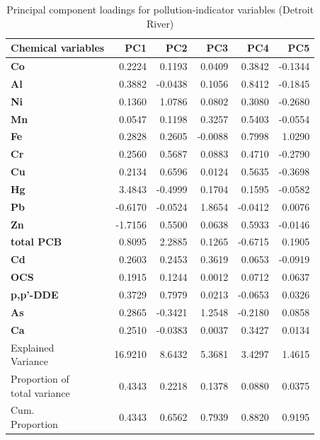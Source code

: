 \begin{table}[htbp]
  \centering
  \caption{Principal component loadings for pollution-indicator variables (Detroit River)}
  \label{tab:dr_01_pollution_assessment_pc_loadings}
  \begin{tabular}{lrrrrr}
    \toprule
    \textbf{Chemical variables} & \textbf{PC1} & \textbf{PC2} & \textbf{PC3} & \textbf{PC4} & \textbf{PC5} \\
    \midrule
    \textbf{Co} & 0.2224 & 0.1193 & 0.0409 & 0.3842 & -0.1344 \\
    \textbf{Al} & 0.3882 & -0.0438 & 0.1056 & 0.8412 & -0.1845 \\
    \textbf{Ni} & 0.1360 & 1.0786 & 0.0802 & 0.3080 & -0.2680 \\
    \textbf{Mn} & 0.0547 & 0.1198 & 0.3257 & 0.5403 & -0.0554 \\
    \textbf{Fe} & 0.2828 & 0.2605 & -0.0088 & 0.7998 & 1.0290 \\
    \textbf{Cr} & 0.2560 & 0.5687 & 0.0883 & 0.4710 & -0.2790 \\
    \textbf{Cu} & 0.2134 & 0.6596 & 0.0124 & 0.5635 & -0.3698 \\
    \addlinespace
    \textbf{Hg} & 3.4843 & -0.4999 & 0.1704 & 0.1595 & -0.0582 \\
    \textbf{Pb} & -0.6170 & -0.0524 & 1.8654 & -0.0412 & 0.0076 \\
    \textbf{Zn} & -1.7156 & 0.5500 & 0.0638 & 0.5933 & -0.0146 \\
    \textbf{total PCB} & 0.8095 & 2.2885 & 0.1265 & -0.6715 & 0.1905 \\
    \textbf{Cd} & 0.2603 & 0.2453 & 0.3619 & 0.0653 & -0.0919 \\
    \addlinespace
    \textbf{OCS} & 0.1915 & 0.1244 & 0.0012 & 0.0712 & 0.0637 \\
    \textbf{p,p'-DDE} & 0.3729 & 0.7979 & 0.0213 & -0.0653 & 0.0326 \\
    \addlinespace
    \textbf{As} & 0.2865 & -0.3421 & 1.2548 & -0.2180 & 0.0858 \\
    \addlinespace
    \textbf{Ca} & 0.2510 & -0.0383 & 0.0037 & 0.3427 & 0.0134 \\
    \midrule
    \makecell[l]{Explained\\Variance} & 16.9210 & 8.6432 & 5.3681 & 3.4297 & 1.4615 \\
    \makecell[l]{Proportion of\\total variance} & 0.4343 & 0.2218 & 0.1378 & 0.0880 & 0.0375 \\
    \makecell[l]{Cum.\\Proportion} & 0.4343 & 0.6562 & 0.7939 & 0.8820 & 0.9195 \\
    \bottomrule
  \end{tabular}
\end{table}

